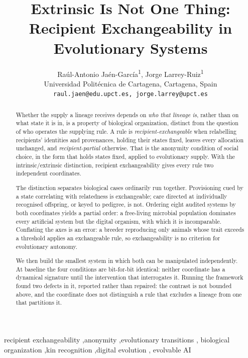 \documentclass[review,3p,times]{elsarticle}
\newcommand{\aind}{\textsuperscript{1}}
\begin{document}
\begin{frontmatter}

\title{Extrinsic Is Not One Thing: Recipient Exchangeability in
Evolutionary Systems}

\author{
Ra\'ul-Antonio Ja\'en-Garc\'ia\aind,
Jorge Larrey-Ruiz\aind\\
{Universidad Polit\'ecnica de Cartagena, Cartagena, Spain}\\
{\small \texttt{raul.jaen@edu.upct.es, jorge.larrey@upct.es}}
}

\setcounter{footnote}{1}
\renewcommand\thefootnote{\arabic{footnote}}

\begin{abstract}
Whether the supply a lineage receives depends on \emph{who that lineage is},
rather than on what state it is in, is a property of biological organization,
distinct from the question of who operates the supplying rule. A rule is
\emph{recipient-exchangeable} when relabelling recipients' identities and
provenances, holding their states fixed, leaves every allocation unchanged,
and \emph{recipient-partial} otherwise. That is the anonymity condition of
social choice, in the form that holds states fixed, applied to evolutionary
supply. With the intrinsic/extrinsic distinction, recipient exchangeability
gives every rule two independent coordinates.

The distinction separates biological cases ordinarily run together.
Provisioning cued by a state correlating with relatedness is exchangeable;
care directed at individually recognised offspring, or keyed to pedigree, is
not. Ordering eight audited systems by both coordinates yields a partial
order: a free-living microbial population dominates every artificial system
but the digital organism, with which it is incomparable. Conflating
the axes is an error: a breeder reproducing only animals whose trait exceeds a
threshold applies an exchangeable rule, so exchangeability is no criterion for
evolutionary autonomy.

We then build the smallest system in which both can be manipulated
independently. At baseline the four conditions are bit-for-bit identical:
neither coordinate has a dynamical signature until the intervention that
interrogates it. Running the framework found two
defects in it, reported rather than repaired: the contrast is not bounded
above, and the coordinate does not distinguish a rule that excludes a lineage
from one that partitions it.
\end{abstract}

\begin{keyword}
recipient exchangeability \sep anonymity \sep evolutionary transitions \sep
biological organization \sep kin recognition \sep digital evolution \sep
evolvable AI
\end{keyword}

\end{frontmatter}
\end{document}
